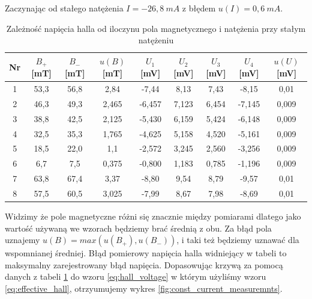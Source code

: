 \documentclass[12pt]{article}
\begin{document}
Zaczynając od stałego natężenia $I = -26{,}8 \ mA$ z błędem $u(I) = 0{,}6 \ mA$.
\begin{table}[H]
    \centering
    \begin{tabular}{c|ccc|ccccc}
        \toprule
        Nr & $B_+$ [mT] & $B_-$ [mT] & $u(B)$ [mT] & $U_1$ [mV] & $U_2$ [mV] & $U_3$ [mV] & $U_4$ [mV] & $u(U)$ [mV] \\
        \midrule
        1 & 53{,}3 & 56{,}8 & 2{,}84  & -7{,}44 & 8{,}13 & 7{,}43 & -8{,}15 & 0{,}01 \\
        2 & 46{,}3 & 49{,}3 & 2{,}465 & -6{,}457 & 7{,}123 & 6{,}454 & -7{,}145 & 0{,}009 \\
        3 & 38{,}8 & 42{,}5 & 2{,}125 & -5{,}430 & 6{,}159 & 5{,}424 & -6{,}148 & 0{,}009 \\
        4 & 32{,}5 & 35{,}3 & 1{,}765 & -4{,}625 & 5{,}158 & 4{,}520 & -5{,}161 & 0{,}009 \\
        5 & 18{,}5 & 22{,}0 & 1{,}1   & -2{,}572 & 3{,}245 & 2{,}560 & -3{,}256 & 0{,}009 \\
        6 & 6{,}7  & 7{,}5  & 0{,}375 & -0{,}800 & 1{,}183 & 0{,}785 & -1{,}196 & 0{,}009 \\
        7 & 63{,}8 & 67{,}4 & 3{,}37  & -8{,}80 & 9{,}54 & 8{,}79 & -9{,}57 & 0{,}01 \\
        8 & 57{,}5 & 60{,}5 & 3{,}025 & -7{,}99 & 8{,}67 & 7{,}98 & -8{,}69 & 0{,}01 \\
        \bottomrule
    \end{tabular}
    \caption{Zależność napięcia halla od iloczynu pola magnetycznego i natężenia przy stałym natężeniu}
    \label{tab:const_current_measurements}
\end{table}
Widzimy że pole magnetyczne różni się znacznie między pomiarami dlatego jako wartość używaną we wzorach będziemy brać średnią z obu. Za błąd pola uznajemy $u(B) = max(u(B_+), u(B_-))$, i taki też będziemy uznawać dla wspomnianej średniej.
Błąd pomierowy napięcia halla widniejący w tabeli to maksymalny zarejestrowany błąd napięcia.
Dopasowując krzywą za pomocą danych z tabeli \ref{tab:const_current_measurements} do wzoru \ref{eq:hall_voltage} w którym użyliśmy wzoru \ref{eq:effective_hall}, otrzyumujemy wykres \ref{fig:const_current_measuremnts}.
\end{document}
